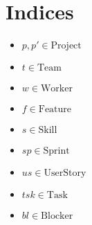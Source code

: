 \documentclass[11pt]{article}
\begin{document}
\section{Indices}
\begin{itemize}
    \item $p, p' \in \text{Project}$
    \item $t \in \text{Team}$
    \item $w \in \text{Worker}$
    \item $f \in \text{Feature}$
    \item $s \in \text{Skill}$
    \item $sp \in \text{Sprint}$
    \item $us \in \text{UserStory}$
    \item $tsk \in \text{Task}$
    \item $bl \in \text{Blocker}$
\end{itemize}
\end{document}
